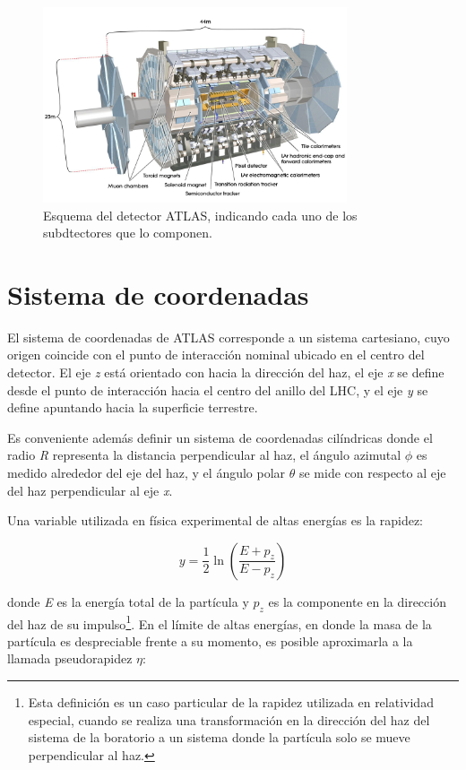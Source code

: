 \begin{figure}
\centering
  \includegraphics[width=0.8\textwidth]{images/atlas_1.jpg}
  \caption{Esquema del detector ATLAS, indicando cada uno de los subdtectores que lo componen.}
  \label{atlas_1}
\end{figure}

\section{Sistema de coordenadas}

El sistema de coordenadas de ATLAS corresponde a un sistema cartesiano, cuyo origen coincide con el punto de interacción nominal ubicado en el centro del detector. El eje \textit{z} está orientado con hacia la dirección del haz, el eje \textit{x} se define desde el punto de interacción hacia el centro del anillo del LHC, y el eje \textit{y} se define apuntando hacia la superficie terrestre.

Es conveniente además definir un sistema de coordenadas cilíndricas donde el radio \textit{R} representa la distancia perpendicular al haz, el ángulo azimutal $\phi$ es medido alrededor del eje del haz, y el ángulo polar $\theta$ se mide con respecto al eje del haz perpendicular al eje \textit{x}. 

Una variable utilizada en física experimental de altas energías es la rapidez:

\begin{equation}
y=\frac{1}{2}\ln\left( \frac{E+p_{z}}{E-p_{z}}\right)
\end{equation}

\noindent
donde \textit{E} es la energía total de la partícula y $p_{z}$ es la componente en la dirección del haz de su impulso\footnote{Esta definición es un caso particular de la rapidez utilizada en relatividad especial, cuando se realiza una transformación en la dirección del haz del sistema de la boratorio a un sistema donde la partícula solo se mueve perpendicular al haz.}. En el límite de altas energías, en donde la masa de la partícula es despreciable frente a su momento, es posible aproximarla a la llamada pseudorapidez $\eta$:

